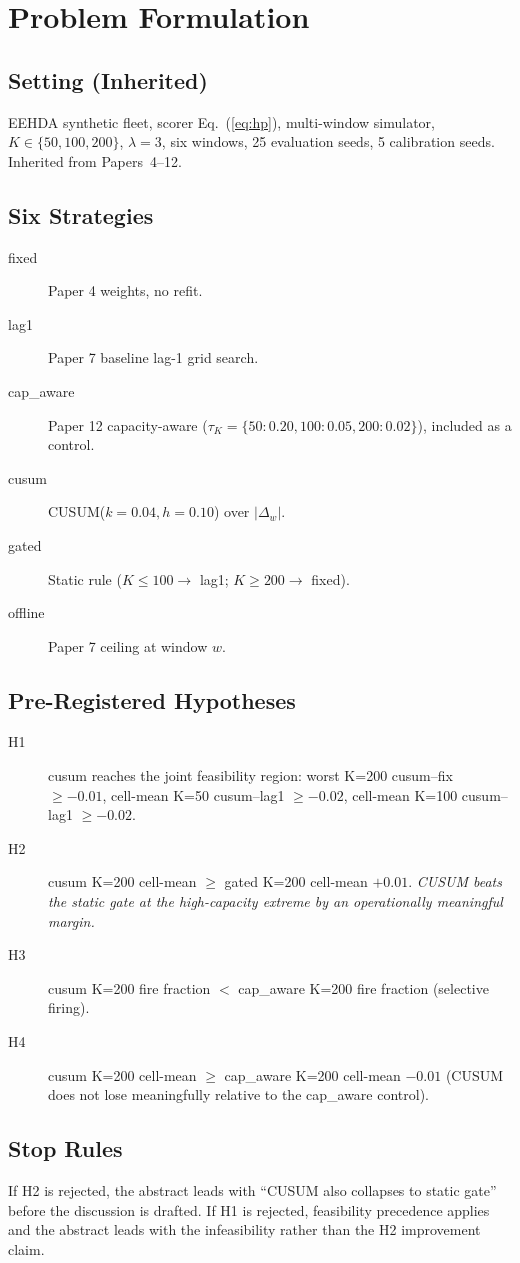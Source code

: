 \section{Problem Formulation}
\label{sec:problem}

\subsection{Setting (Inherited)}

EEHDA synthetic fleet, scorer Eq.~(\ref{eq:hp}), multi-window
simulator, $K \in \{50, 100, 200\}$, $\lambda = 3$, six windows,
25 evaluation seeds, 5 calibration seeds. Inherited from
Papers~4--12.

\subsection{Six Strategies}

\begin{description}
\item[\textsf{fixed}] Paper 4 weights, no refit.
\item[\textsf{lag1}] Paper 7 baseline lag-1 grid search.
\item[\textsf{cap\_aware}] Paper 12 capacity-aware ($\tau_K = \{50:
0.20, 100: 0.05, 200: 0.02\}$), included as a control.
\item[\textsf{cusum}] CUSUM($k = 0.04, h = 0.10$) over $|\Delta_w|$.
\item[\textsf{gated}] Static rule ($K \leq 100 \to$ lag1; $K \geq
200 \to$ fixed).
\item[\textsf{offline}] Paper 7 ceiling at window $w$.
\end{description}

\subsection{Pre-Registered Hypotheses}

\begin{description}
\item[H1] \textsf{cusum} reaches the joint feasibility region:
worst K=200 cusum--fix $\geq -0.01$, cell-mean K=50 cusum--lag1
$\geq -0.02$, cell-mean K=100 cusum--lag1 $\geq -0.02$.
\item[H2] \textsf{cusum} K=200 cell-mean $\geq$ \textsf{gated}
K=200 cell-mean $+ 0.01$. \textit{CUSUM beats the static gate at
the high-capacity extreme by an operationally meaningful margin.}
\item[H3] \textsf{cusum} K=200 fire fraction $<$ \textsf{cap\_aware}
K=200 fire fraction (selective firing).
\item[H4] \textsf{cusum} K=200 cell-mean $\geq$ \textsf{cap\_aware}
K=200 cell-mean $- 0.01$ (CUSUM does not lose meaningfully relative
to the cap\_aware control).
\end{description}

\subsection{Stop Rules}

If H2 is rejected, the abstract leads with ``CUSUM also collapses to
static gate'' before the discussion is drafted. If H1 is rejected,
feasibility precedence applies and the abstract leads with the
infeasibility rather than the H2 improvement claim.
